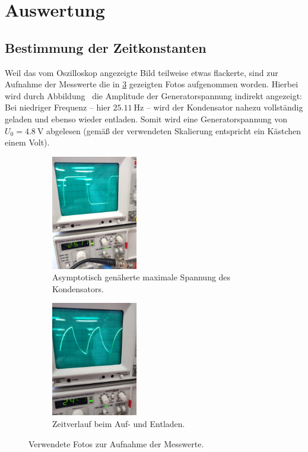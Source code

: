 \section{Auswertung}
\label{sec:Auswertung}

\subsection{Bestimmung der Zeitkonstanten}

Weil das vom Oszilloskop angezeigte Bild teilweise etwas flackerte, sind zur Aufnahme der Messwerte die in \ref{fig:messA}
gezeigten Fotos aufgenommen worden. 
Hierbei wird durch Abbildung~ die Amplitude der Generatorspannung indirekt angezeigt: 
Bei niedriger Frequenz -- hier ${\SI{25.11}{\hertz}}$ -- wird der Kondensator nahezu vollständig geladen und ebenso wieder entladen. 
Somit wird eine Generatorspannung von ${U_0=\SI{4.8}{\volt}}$ abgelesen (gemäß der verwendeten Skalierung entspricht 
ein Kästchen einem Volt).

\begin{figure}
    \centering
    \begin{subfigure}{0.48\textwidth}
        \centering
        \includegraphics[height=5cm,angle=-90]{plots/maxLadungKond.jpg}
        \caption{Asymptotisch genäherte maximale Spannung des Kondensators.}
        \label{fig:maxU_C}
    \end{subfigure}
    \begin{subfigure}{0.48\textwidth}
        \centering
        \includegraphics[height=5cm,angle=-90]{plots/LadungKondZacken.jpg}
        \caption{Zeitverlauf beim Auf- und Entladen.}
        \label{fig:UpAndDown}
    \end{subfigure}
    \caption{Verwendete Fotos zur Aufnahme der Messwerte.}
    \label{fig:messA}
\end{figure}

